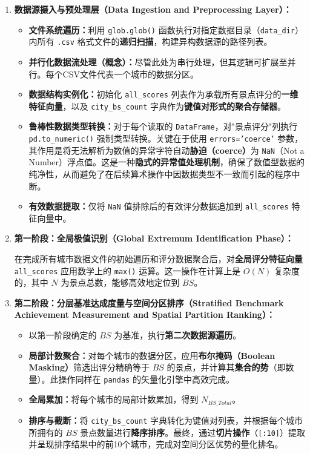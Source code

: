 \documentclass[12pt]{article}
\begin{document}
\begin{enumerate}
    \item \textbf{数据源摄入与预处理层（Data Ingestion and Preprocessing Layer）：}
    \begin{itemize}
        \item \textbf{文件系统遍历：}利用 \texttt{glob.glob()} 函数执行对指定数据目录（\texttt{data\_dir}）内所有 \texttt{.csv} 格式文件的\textbf{递归扫描}，构建异构数据源的路径列表。
        \item \textbf{并行化数据流处理（概念）：}尽管此处为串行处理，但其逻辑可扩展至并行。每个CSV文件代表一个城市的数据分区。
        \item \textbf{数据结构实例化：}初始化 \texttt{all\_scores} 列表作为承载所有景点评分的\textbf{一维特征向量}，以及 \texttt{city\_bs\_count} 字典作为\textbf{键值对形式的聚合存储器}。
        \item \textbf{鲁棒性数据类型转换：}对于每个读取的 \texttt{DataFrame}，对"景点评分"列执行 \texttt{pd.to\_numeric()} 强制类型转换。关键在于使用 \texttt{errors='coerce'} 参数，其作用是将无法解析为数值的异常字符自动\textbf{胁迫（coerce）}为 \texttt{NaN}（Not a Number）浮点值。这是一种\textbf{隐式的异常值处理机制}，确保了数值型数据的纯净性，从而避免了在后续算术操作中因数据类型不一致而引起的程序中断。
        \item \textbf{有效数据提取：}仅将 \texttt{NaN} 值排除后的有效评分数据追加到 \texttt{all\_scores} 特征向量中。
    \end{itemize}

    \item \textbf{第一阶段：全局极值识别（Global Extremum Identification Phase）：}
    
    在完成所有城市数据文件的初始遍历和评分数据聚合后，对\textbf{全局评分特征向量} \texttt{all\_scores} 应用数学上的 \texttt{max()} 运算。这一操作在计算上是 $O(N)$ 复杂度的，其中 $N$ 为景点总数，能够高效地定位到 $BS$。

    \item \textbf{第二阶段：分层基准达成度量与空间分区排序（Stratified Benchmark Achievement Measurement and Spatial Partition Ranking）：}
    \begin{itemize}
        \item 以第一阶段确定的 $BS$ 为基准，执行\textbf{第二次数据源遍历}。
        \item \textbf{局部计数聚合：}对每个城市的数据分区，应用\textbf{布尔掩码（Boolean Masking）}筛选出评分精确等于 $BS$ 的景点，并计算其\textbf{集合的势}（即数量）。此操作同样在 \texttt{pandas} 的矢量化引擎中高效完成。
        \item \textbf{全局累加：}将每个城市的局部计数累加，得到 $N_{BS\_Total}$。
        \item \textbf{排序与截断：}将 \texttt{city\_bs\_count} 字典转化为键值对列表，并根据每个城市所拥有的 $BS$ 景点数量进行\textbf{降序排序}。最终，通过\textbf{切片操作}（\texttt{[:10]}）提取并呈现排序结果中的前10个城市，完成对空间分区优势的量化排名。
    \end{itemize}
\end{enumerate}
\end{document}
